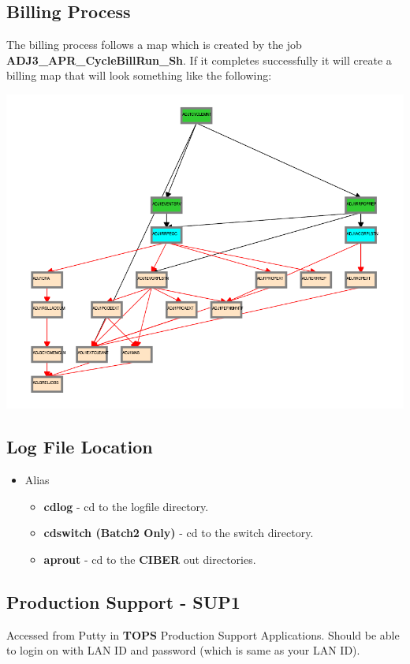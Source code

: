 \documentclass[12pt,twoside]{article}
\begin{document}
\subsection{Billing Process}
\label{sec:orgheadline11}
The billing process follows a map which is created by the job
\textbf{ADJ3\_APR\_CycleBillRun\_Sh}. If it completes successfully it
will create a billing map that will look something like the
following:

\includegraphics[width=.9\linewidth]{Pictures/billing_tc_map-27124108.png}

\subsection{Log File Location}
\label{sec:orgheadline12}
\begin{itemize}
\item Alias
\begin{itemize}
\item \textbf{cdlog} - cd to the logfile directory.
\item \textbf{cdswitch (Batch2 Only)} - cd to the switch directory.
\item \textbf{aprout} - cd to the \textbf{CIBER} out directories.
\end{itemize}
\end{itemize}

\subsection{Production Support - SUP1}
\label{sec:orgheadline13}
Accessed from Putty in \textbf{TOPS} Production Support Applications.
Should be able to login on with LAN ID and password (which is
same as your LAN ID).
\footnotesize
\end{document}
